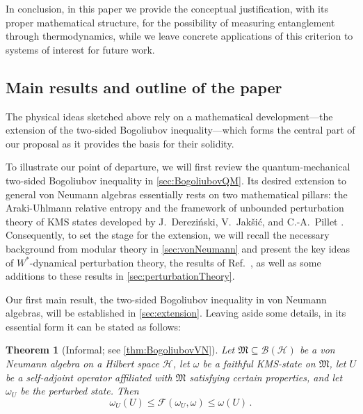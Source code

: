 \documentclass[a4paper, twoside, 11pt, reqno]{amsart}
\theoremstyle{definition}
\theoremstyle{plain}
\newtheorem*{theorem*}{Theorem}
\renewcommand{\subset}{\subseteq}
\newcommand{\MF}{\mathcal{F}}
\newcommand{\MH}{\mathcal{H}}
\newcommand{\MFM}{\mathfrak{M}}
\newcommand{\BO}{\mathscr{B}}
\newcommand{\1}{\mathbf{1}}
\begin{document}
In conclusion, in this paper we provide the conceptual justification, with its proper mathematical structure, for the possibility of measuring entanglement through thermodynamics, while we leave concrete applications of this criterion to systems of interest for future work.


\subsection{Main results and outline of the paper}

The physical ideas sketched above rely on a mathematical development---the extension of the two-sided Bogoliubov inequality---which forms the central part of our proposal as it provides the basis for their solidity.

To illustrate our point of departure, we will first review the quantum-mechanical two-sided Bogoliubov inequality in \cref{sec:BogoliubovQM}. Its desired extension to general von Neumann algebras essentially rests on two mathematical pillars: the Araki-Uhlmann relative entropy \cite{Araki1976, Araki1977, Uhlmann1977} and the framework of unbounded perturbation theory of KMS states developed by J.~Derezi\'{n}ski, V.~Jak\v{s}i\'{c}, and C.-A.~Pillet \cite{DJP03}. Consequently, to set the stage for the extension, we will recall the necessary background from modular theory in \cref{sec:vonNeumann} and present the key ideas of $W^\ast$-dynamical perturbation theory, the results of Ref.~\cite{DJP03}, as well as some additions to these results in \cref{sec:perturbationTheory}.

Our first main result, the two-sided Bogoliubov inequality in von Neumann algebras, will be established in \cref{sec:extension}. Leaving aside some details, in its essential form it can be stated as follows:

\begin{theorem*}[Informal; see \cref{thm:BogoliubovVN}]
    Let $\MFM \subset \BO(\MH)$ be a von Neumann algebra on a Hilbert space $\MH$, let $\omega$ be a faithful KMS-state on $\MFM$, let $U$ be a self-adjoint operator affiliated with $\MFM$ satisfying certain properties, and let $\omega_U$ be the perturbed state. Then
    \begin{equation}\label{eq:informalBogoliubovVN}
        \omega_U(U) \le \MF(\omega_U, \omega) \le \omega(U) \, .
    \end{equation}
\end{theorem*}
\end{document}
